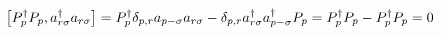 \documentclass[11pt]{article} %
\begin{document}
\begin{equation}
\begin{equation}
\left[P_p^\dagger P_p, a_{r \sigma}^\dagger a_{r\sigma}\right]=P_p^\dagger\delta_{p,r} a_{p -\sigma} a_{r\sigma}-\delta_{p,r}a_{r\sigma}^\dagger a_{p-\sigma}^\dagger P_p=P_p^\dagger P_p-P_p^\dagger P_p =0\end{equation}
%
%
%
%
%
%
\end{document}
